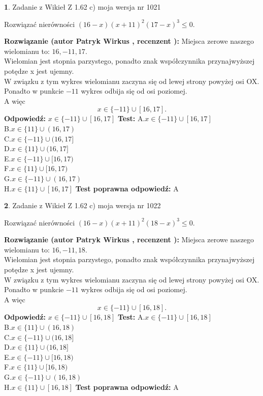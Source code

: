\documentclass[12pt, a4paper]{article}
\theoremstyle{definition} %
\newtheorem{zad}{}
\newcommand{\zadStart}[1]{\begin{zad}#1\newline}
\newcommand{\zadStop}{\end{zad}}
\newcommand{\rozwStart}[2]{\noindent \textbf{Rozwiązanie (autor #1 , recenzent #2): }\newline}
\newcommand{\rozwStop}{\newline}
\newcommand{\odpStart}{\noindent \textbf{Odpowiedź:}\newline}
\newcommand{\odpStop}{\newline}
\newcommand{\testStart}{\noindent \textbf{Test:}\newline}
\newcommand{\testStop}{\newline}
\newcommand{\kluczStart}{\noindent \textbf{Test poprawna odpowiedź:}\newline}
\newcommand{\kluczStop}{\newline}
\begin{document}
\zadStart{Zadanie z Wikieł Z 1.62 c) moja wersja nr 1021}

Rozwiązać nierówności $(16-x)(x+11)^{2}(17-x)^{3}\le0$.
\zadStop
\rozwStart{Patryk Wirkus}{}
Miejsca zerowe naszego wielomianu to: $16, -11, 17$.\\
Wielomian jest stopnia parzystego, ponadto znak współczynnika przy\linebreak najwyższej potędze x jest ujemny.\\ W związku z tym wykres wielomianu zaczyna się od lewej strony powyżej osi OX.\\
Ponadto w punkcie $-11$ wykres odbija się od osi poziomej.\\
A więc $$x \in \{-11\} \cup [16,17].$$
\rozwStop
\odpStart
$x \in \{-11\} \cup [16,17]$
\odpStop
\testStart
A.$x \in \{-11\} \cup [16,17]$\\
B.$x \in \{11\} \cup (16,17)$\\
C.$x \in \{-11\} \cup (16,17]$\\
D.$x \in \{11\} \cup (16,17]$\\
E.$x \in \{-11\} \cup [16,17)$\\
F.$x \in \{11\} \cup [16,17)$\\
G.$x \in \{-11\} \cup (16,17)$\\
H.$x \in \{11\} \cup [16,17]$
\testStop
\kluczStart
A
\kluczStop



\zadStart{Zadanie z Wikieł Z 1.62 c) moja wersja nr 1022}

Rozwiązać nierówności $(16-x)(x+11)^{2}(18-x)^{3}\le0$.
\zadStop
\rozwStart{Patryk Wirkus}{}
Miejsca zerowe naszego wielomianu to: $16, -11, 18$.\\
Wielomian jest stopnia parzystego, ponadto znak współczynnika przy\linebreak najwyższej potędze x jest ujemny.\\ W związku z tym wykres wielomianu zaczyna się od lewej strony powyżej osi OX.\\
Ponadto w punkcie $-11$ wykres odbija się od osi poziomej.\\
A więc $$x \in \{-11\} \cup [16,18].$$
\rozwStop
\odpStart
$x \in \{-11\} \cup [16,18]$
\odpStop
\testStart
A.$x \in \{-11\} \cup [16,18]$\\
B.$x \in \{11\} \cup (16,18)$\\
C.$x \in \{-11\} \cup (16,18]$\\
D.$x \in \{11\} \cup (16,18]$\\
E.$x \in \{-11\} \cup [16,18)$\\
F.$x \in \{11\} \cup [16,18)$\\
G.$x \in \{-11\} \cup (16,18)$\\
H.$x \in \{11\} \cup [16,18]$
\testStop
\kluczStart
A
\kluczStop
\end{document}
